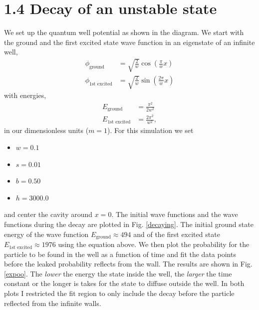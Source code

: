 \documentclass[singlepage,notitlepage,nofootinbib,11pt]{revtex4-1}
\begin{document}
\section*{1.4 Decay of an unstable state}
We set up the quantum well potential as shown in the diagram. We start with the ground and the first excited state wave function in an eigenstate of an infinite well,
\begin{align*}
  \phi_{\text{ground}} &= \sqrt{\frac{2}{w}}\cos\left(\frac{\pi}{w}x\right)\\
  \phi_{\text{1st excited}} &= \sqrt{\frac{2}{w}}\sin\left(\frac{2\pi}{w}x\right)
\end{align*}
with energies,
\begin{align*}
  E_{\text{ground}} &= \frac{\pi^2}{2 w^2}\\
  E_{\text{1st excited}} &= \frac{2 \pi^2}{w^2},
\end{align*}
in our dimensionless units ($m=1$). For this simulation we set 
\begin{itemize}
\item $w=0.1$
\item $s=0.01$
\item $b=0.50$
\item $h=3000.0$
\end{itemize}
and center the cavity around $x=0$. The initial wave functions and the wave functions during the decay are plotted in Fig. \ref{decaying}. The initial ground state energy of the wave function $E_{\text{ground}}\approx494$ and of the first excited state $E_{\text{1st excited}}\approx 1976$ using the equation above. We then plot the probability for the particle to be found in the well as a function of time and fit the data points before the leaked probability reflects from the wall. The results are shown in Fig. \ref{expoo}. The {\it lower} the energy the state inside the well, the {\it larger} the time constant or the longer is takes for the state to diffuse outside the well. In both plots I restricted the fit region to only include the decay before the particle reflected from the infinite walls.
\end{document}
